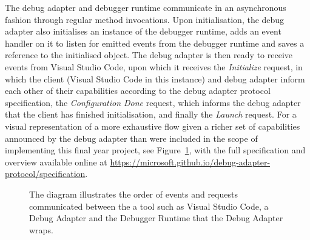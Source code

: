 \documentclass[12pt,pdftex,titlepage]{report}
\begin{document}
                The debug adapter and debugger runtime communicate in an asynchronous fashion through regular method invocations. Upon initialisation, the debug adapter also initialises an instance of the debugger runtime, adds an event handler 
                on it to listen for emitted events from the debugger runtime and saves a reference to the initialised object. The debug adapter is then ready to receive events from Visual Studio Code, upon which it receives the \textit{Initialize}
                request, in which the client (Visual Studio Code in this instance) and debug adapter inform each other of their capabilities according to the debug adapter protocol specification, the \textit{Configuration Done} request, which informs 
                the debug adapter that the client has finished initialisation, and finally the \textit{Launch} request. For a visual representation of a more exhaustive flow given a richer set of capabilities announced by the debug adapter than were
                included in the scope of implementing this final year project, see Figure~\ref{fig:dapflow}, with the full specification and overview available online at \url{https://microsoft.github.io/debug-adapter-protocol/specification}.
                
                \begin{figure}[htb!]
                    \centering
                    \caption{The diagram illustrates the order of events and requests communicated between the a tool such as Visual Studio Code, a Debug Adapter and the Debugger Runtime that the Debug Adapter wraps.}
                    \label{fig:dapflow}
                \end{figure}
                
\end{document}
